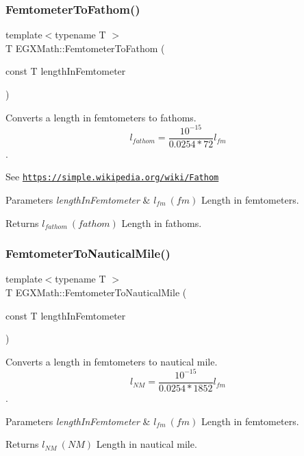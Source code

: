 \subsubsection{\texorpdfstring{Femtometer\+To\+Fathom()}{FemtometerToFathom()}}
{\footnotesize\ttfamily template$<$typename T $>$ \\
T E\+G\+X\+Math\+::\+Femtometer\+To\+Fathom (\begin{DoxyParamCaption}\item[{const T}]{length\+In\+Femtometer }\end{DoxyParamCaption})}



Converts a length in femtometers to fathoms. \[ l_{fathom}= \frac{10^{-15}}{0.0254 * 72} l_{fm} \]. 

See \href{https://simple.wikipedia.org/wiki/Fathom}{\tt https\+://simple.\+wikipedia.\+org/wiki/\+Fathom} 
\begin{DoxyParams}{Parameters}
{\em length\+In\+Femtometer} & $ l_{fm}\ (fm)$ Length in femtometers. \\
\hline
\end{DoxyParams}
\begin{DoxyReturn}{Returns}
$ l_{fathom}\ (fathom)$ Length in fathoms. 
\end{DoxyReturn}
\mbox{\label{group___e_g_x_math-_conversions-_length_conversions-_s_i-_femtometer-_nautical_gae44357e3e44868120d603cff76cefd77}} 
\subsubsection{\texorpdfstring{Femtometer\+To\+Nautical\+Mile()}{FemtometerToNauticalMile()}}
{\footnotesize\ttfamily template$<$typename T $>$ \\
T E\+G\+X\+Math\+::\+Femtometer\+To\+Nautical\+Mile (\begin{DoxyParamCaption}\item[{const T}]{length\+In\+Femtometer }\end{DoxyParamCaption})}



Converts a length in femtometers to nautical mile. \[ l_{NM}= \frac{10^{-15}}{0.0254 * 1852} l_{fm} \]. 


\begin{DoxyParams}{Parameters}
{\em length\+In\+Femtometer} & $ l_{fm}\ (fm)$ Length in femtometers. \\
\hline
\end{DoxyParams}
\begin{DoxyReturn}{Returns}
$ l_{NM}\ (NM)$ Length in nautical mile. 
\end{DoxyReturn}
